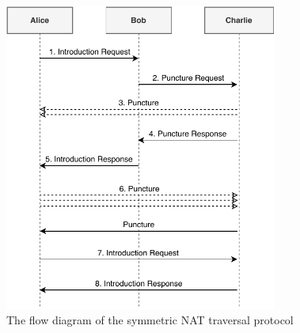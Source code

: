 \begin{figure}[h!]
    \centering
    \includegraphics[width=0.8\textwidth]{diagrams/symmetric-nat-puncturing}
    \caption{The flow diagram of the symmetric NAT traversal protocol}
    \label{extended-peer-introduction}
\end{figure}




